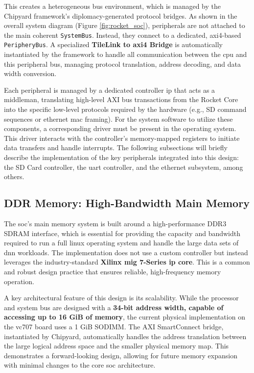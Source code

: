 This creates a heterogeneous bus environment, which is managed by the Chipyard framework's diplomacy-generated protocol bridges. As shown in the overall system diagram (Figure \ref{fig:rocket_soc}), peripherals are not attached to the main coherent \texttt{SystemBus}. Instead, they connect to a dedicated, \acrshort{axi4}-based \texttt{PeripheryBus}. A specialized \textbf{TileLink to \acrshort{axi4} Bridge} is automatically instantiated by the framework to handle all communication between the \acrshort{cpu} and this peripheral bus, managing protocol translation, address decoding, and data width conversion.

Each peripheral is managed by a dedicated controller \acrshort{ip} that acts as a middleman, translating high-level AXI bus transactions from the Rocket Core into the specific low-level protocols required by the hardware (e.g., SD command sequences or \acrshort{ethernet} \acrshort{mac} framing). For the system software to utilize these components, a corresponding driver must be present in the operating system. This driver interacts with the controller's memory-mapped registers to initiate data transfers and handle interrupts. The following subsections will briefly describe the implementation of the key peripherals integrated into this design: the SD Card controller, the \acrshort{uart} controller, and the \acrshort{ethernet} subsystem, among others.

\subsection{DDR Memory: High-Bandwidth Main Memory}

The \acrshort{soc}'s main memory system is built around a high-performance DDR3 SDRAM interface, which is essential for providing the capacity and bandwidth required to run a full \acrshort{linux} operating system and handle the large data sets of \acrshort{dnn} workloads. The implementation does not use a custom controller but instead leverages the industry-standard \textbf{Xilinx \acrfull{mig} 7-Series \acrshort{ip} core}. This is a common and robust design practice that ensures reliable, high-frequency memory operation.

A key architectural feature of this design is its scalability. While the processor and system bus are designed with a \textbf{34-bit address width, capable of accessing up to 16 GiB of memory}, the current physical implementation on the \acrshort{vc707} board uses a 1 GiB SODIMM. The AXI SmartConnect bridge, instantiated by Chipyard, automatically handles the address translation between the large logical address space and the smaller physical memory map. This demonstrates a forward-looking design, allowing for future memory expansion with minimal changes to the core \acrshort{soc} architecture.

